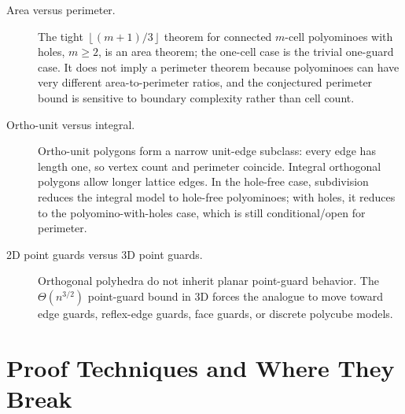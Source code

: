 \documentclass[11pt]{article}
\newcommand{\floor}[1]{\left\lfloor #1 \right\rfloor}
\begin{document}
\begin{description}
  \item[Area versus perimeter.]
  The tight $\floor{(m+1)/3}$ theorem for connected $m$-cell polyominoes with
  holes, $m\geq 2$, is an area theorem; the one-cell case is the trivial
  one-guard case.  It does not imply a perimeter theorem because polyominoes
  can have very different area-to-perimeter ratios, and the conjectured
  perimeter bound is sensitive to boundary complexity rather than cell count.

  \item[Ortho-unit versus integral.]
  Ortho-unit polygons form a narrow unit-edge subclass: every edge has length
  one, so vertex count and perimeter coincide.  Integral orthogonal polygons
  allow longer lattice edges.  In the hole-free case, subdivision reduces the
  integral model to hole-free polyominoes; with holes, it reduces to the
  polyomino-with-holes case, which is still conditional/open for perimeter.

  \item[2D point guards versus 3D point guards.]
  Orthogonal polyhedra do not inherit planar point-guard behavior.  The
  $\Theta(n^{3/2})$ point-guard bound in 3D forces the analogue to move toward
  edge guards, reflex-edge guards, face guards, or discrete polycube models.
\end{description}

\section{Proof Techniques and Where They Break}
\end{document}
